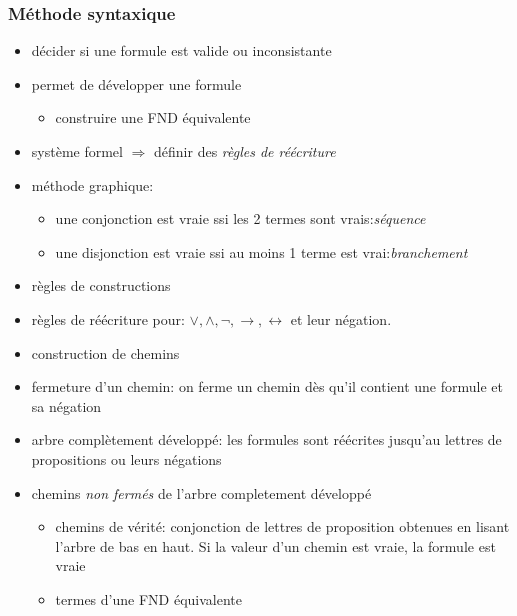\documentclass[10pt,a4paper]{article}
\begin{document}
		\subsubsection{Méthode syntaxique}
			\begin{itemize}
				\item décider si une formule est valide ou inconsistante
				\item permet de développer une formule
				\begin{itemize}
					\item construire une FND équivalente
				\end{itemize}
				\item système formel $\Rightarrow$ définir des \emph{règles de réécriture}
				\item méthode graphique:
				\begin{itemize}
					\item une conjonction est vraie ssi les 2 termes sont vrais:\emph{séquence}
					\item une disjonction est vraie ssi au moins 1 terme est vrai:\emph{branchement}
				\end{itemize}
				\item règles de constructions
				\item règles de réécriture pour: $\vee,\wedge,\neg,\rightarrow,\leftrightarrow$ et leur négation.
				\item construction de chemins
				\item fermeture d'un chemin: on ferme un chemin dès qu'il contient une formule et sa négation
				\item arbre complètement développé: les formules sont réécrites jusqu'au lettres de propositions ou leurs négations
				\item chemins \emph{non fermés} de l'arbre completement développé
				\begin{itemize}
					\item chemins de vérité: conjonction de lettres de proposition obtenues en lisant l'arbre de bas en haut. Si la valeur d'un chemin est vraie, la formule est vraie
					\item termes d'une FND équivalente
				\end{itemize}
			\end{itemize}
\end{document}
